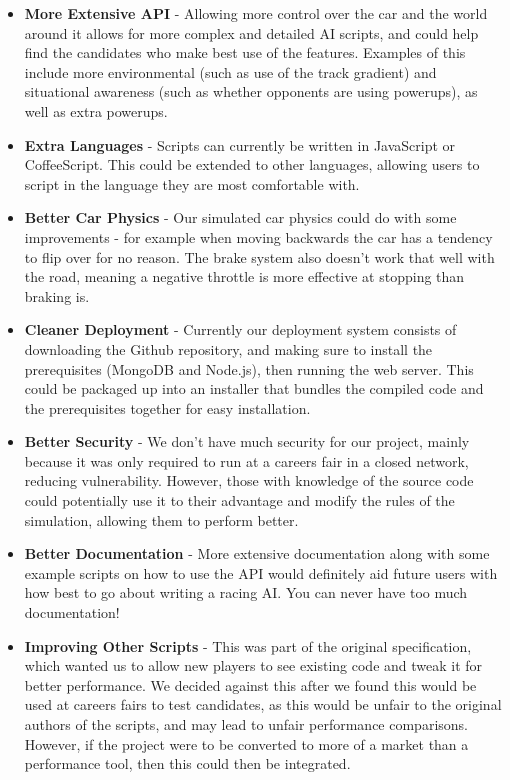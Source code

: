\begin{itemize}
    \item
        \textbf{More Extensive API} - Allowing more control over the car and the world around it allows for more complex and detailed AI scripts, and could help find the candidates who make best use of the features.  Examples of this include more environmental (such as use of the track gradient) and situational awareness (such as whether opponents are using powerups), as well as extra powerups.
    \item
        \textbf{Extra Languages} - Scripts can currently be written in JavaScript or CoffeeScript. This could be extended to other languages, allowing users to script in the language they are most comfortable with.
    \item
        \textbf{Better Car Physics} - Our simulated car physics could do with some improvements - for example when moving backwards the car has a tendency to flip over for no reason. The brake system also doesn't work that well with the road, meaning a negative throttle is more effective at stopping than braking is.
    \item
        \textbf{Cleaner Deployment} - Currently our deployment system consists of downloading the Github repository, and making sure to install the prerequisites (MongoDB and Node.js), then running the web server. This could be packaged up into an installer that bundles the compiled code and the prerequisites together for easy installation.
    \item
        \textbf{Better Security} - We don't have much security for our project, mainly because it was only required to run at a careers fair in a closed network, reducing vulnerability. However, those with knowledge of the source code could potentially use it to their advantage and modify the rules of the simulation, allowing them to perform better.
    \item
        \textbf{Better Documentation} - More extensive documentation along with some example scripts on how to use the API would definitely aid future users with how best to go about writing a racing AI. You can never have too much documentation!
    \item
        \textbf{Improving Other Scripts} - This was part of the original specification, which wanted us to allow new players to see existing code and tweak it for better performance. We decided against this after we found this would be used at careers fairs to test candidates, as this would be unfair to the original authors of the scripts, and may lead to unfair performance comparisons. However, if the project were to be converted to more of a market than a performance tool, then this could then be integrated.
\end{itemize}
